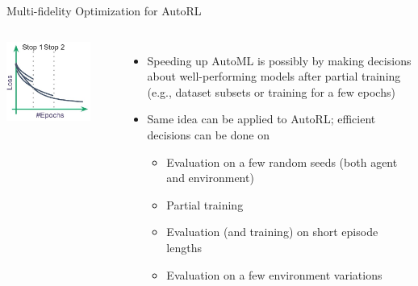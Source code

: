 \documentclass[aspectratio=169]{../latex_main/tntbeamer}  %
\begin{document}
\begin{frame}[c]{Multi-fidelity Optimization for AutoRL}

\begin{columns}


\centering
\includegraphics[width=0.8\textwidth]{images/mf_opt.jpg}


\begin{itemize}
    \item Speeding up AutoML is possibly by making decisions about well-performing models after partial training (e.g., dataset subsets or training for a few epochs)
    \item Same idea can be applied to AutoRL; efficient decisions can be done on
    \begin{itemize}
        \item Evaluation on a few random seeds (both agent and environment)
        \item Partial training
        \item Evaluation (and training) on short episode lengths
        \item Evaluation on a few environment variations
    \end{itemize}
\end{itemize}

\end{columns}

\end{frame}
\end{document}
